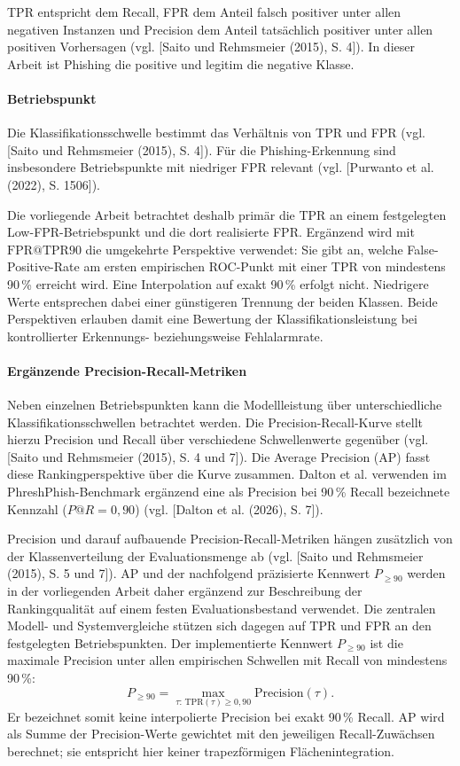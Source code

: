 TPR entspricht dem Recall, FPR dem Anteil falsch positiver unter allen negativen Instanzen und Precision dem Anteil tatsächlich positiver unter allen positiven Vorhersagen (vgl. [Saito und Rehmsmeier (2015), S. 4]). In dieser Arbeit ist Phishing die positive und legitim die negative Klasse.

\paragraph{Betriebspunkt} Die Klassifikationsschwelle bestimmt das Verhältnis von TPR und FPR (vgl. [Saito und Rehmsmeier (2015), S. 4]). Für die Phishing-Erkennung sind insbesondere Betriebspunkte mit niedriger FPR relevant (vgl. [Purwanto et al. (2022), S. 1506]).

Die vorliegende Arbeit betrachtet deshalb primär die TPR an einem festgelegten
Low-FPR-Betriebspunkt und die dort realisierte FPR. Ergänzend wird mit
$\mathrm{FPR@TPR90}$ die umgekehrte Perspektive verwendet: Sie gibt an, welche
False-Positive-Rate am ersten empirischen ROC-Punkt mit einer TPR von mindestens
90\,\% erreicht wird. Eine Interpolation auf exakt 90\,\% erfolgt nicht.
Niedrigere Werte entsprechen dabei einer günstigeren Trennung der beiden Klassen.
Beide Perspektiven erlauben damit eine Bewertung der Klassifikationsleistung bei
kontrollierter Erkennungs- beziehungsweise Fehlalarmrate.

\paragraph{Ergänzende Precision-Recall-Metriken}
Neben einzelnen Betriebspunkten kann die Modellleistung über unterschiedliche
Klassifikationsschwellen betrachtet werden. Die Precision-Recall-Kurve stellt hierzu
Precision und Recall über verschiedene Schwellenwerte gegenüber
(vgl. [Saito und Rehmsmeier (2015), S. 4 und 7]). Die Average Precision (AP) fasst
diese Rankingperspektive über die Kurve zusammen. Dalton et al. verwenden im
PhreshPhish-Benchmark ergänzend eine als Precision bei 90\,\% Recall bezeichnete
Kennzahl ($P@R=0{,}90$) (vgl. [Dalton et al. (2026), S. 7]).

Precision und darauf aufbauende Precision-Recall-Metriken hängen zusätzlich von der
Klassenverteilung der Evaluationsmenge ab
(vgl. [Saito und Rehmsmeier (2015), S. 5 und 7]). AP und der nachfolgend präzisierte
Kennwert $P_{\geq 90}$ werden in der
vorliegenden Arbeit daher ergänzend zur Beschreibung der Rankingqualität auf einem
festen Evaluationsbestand verwendet. Die zentralen Modell- und Systemvergleiche
stützen sich dagegen auf TPR und FPR an den festgelegten Betriebspunkten.
Der implementierte Kennwert $P_{\geq 90}$ ist die maximale Precision unter allen
empirischen Schwellen mit Recall von mindestens 90\,\%:
\[
P_{\geq 90}=\max_{\tau:\,\mathrm{TPR}(\tau)\geq 0{,}90}
\mathrm{Precision}(\tau).
\]
Er bezeichnet somit keine interpolierte Precision bei exakt 90\,\% Recall.
AP wird als Summe der Precision-Werte gewichtet mit den jeweiligen Recall-Zuwächsen
berechnet; sie entspricht hier keiner trapezförmigen Flächenintegration.



